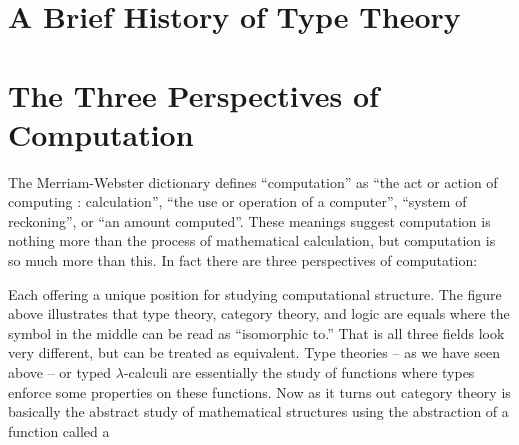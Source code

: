 

















\section{A Brief History of Type Theory}
\label{sec:the_history_of_type_theory}


\section{The Three Perspectives of Computation}
\label{sec:the_three_perspectives}
The Merriam-Webster dictionary defines ``computation'' as ``the act or
action of computing : calculation'', ``the use or operation of a
computer'', ``system of reckoning'', or ``an amount computed''.  These
meanings suggest computation is nothing more than the process of
mathematical calculation, but computation is so much more than this.
In fact there are three perspectives of computation:
    \begin{center}
    \end{center}
Each offering a unique position for studying computational structure.
The figure above illustrates that type theory, category theory, and
logic are equals where the symbol in the middle can be read as
``isomorphic to.''  That is all three fields look very different, but
can be treated as equivalent.  Type theories -- as we have seen above
-- or typed $\lambda$-calculi are essentially the study of functions
where types enforce some properties on these functions.  Now as it
turns out category theory is basically the abstract study of
mathematical structures using the abstraction of a function called a
